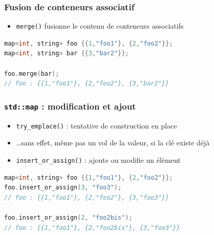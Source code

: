 \documentclass[C++.tex]{subfiles}
\begin{document}
\begin{frame}[fragile]
	\frametitle{Fusion de conteneurs associatif}
	\begin{itemize}
		\item \lstinline|merge()| fusionne le contenu de conteneurs associatifs
	\end{itemize}

	\begin{lstlisting}[language=C++]
map<int, string> foo {{1,"foo1"}, {2,"foo2"}};
map<int, string> bar {{3,"bar2"}};

foo.merge(bar);
// foo : {{1,"foo1"}, {2,"foo2"}, {3,"bar2"}}\end{lstlisting}
\end{frame}

\begin{frame}[fragile]
	\frametitle{\lstinline|std::map| : modification et ajout}


	\begin{itemize}
		\item \lstinline|try_emplace()| : tentative de construction \og en place\fg{}
		\item \ldots sans effet, même pas un \og vol\fg{} de la valeur, si la clé existe déjà
		\item \lstinline|insert_or_assign()| : ajoute ou modifie un élément
	\end{itemize}

	\begin{lstlisting}[language=C++]
map<int, string> foo {{1,"foo1"}, {2,"foo2"}};
foo.insert_or_assign(3, "foo3");
// foo : {{1,"foo1"}, {2,"foo2"}, {3,"foo3"}}

foo.insert_or_assign(2, "foo2bis");
// foo : {{1,"foo1"}, {2,"foo2bis"}, {3,"foo3"}}\end{lstlisting}
\end{frame}
\end{document}
